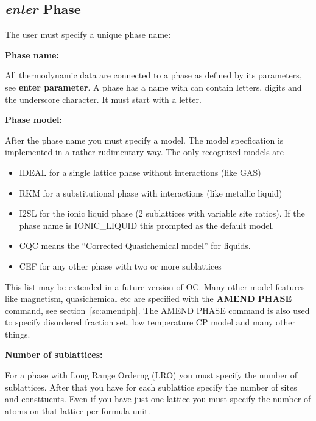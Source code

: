 \documentclass[11pt]{article}
\begin{document}
\hypertarget{Enter phase}{}
\hypertarget{enter phase name}{}
\subsection{{\em enter} Phase}

The user must specify a unique phase name:

{\bf Phase name:}

All thermodynamic data are connected to a phase as defined by its
parameters, see {\bf enter parameter}.  A phase has a name with can
contain letters, digits and the underscore character.  It must start
with a letter.

\hypertarget{Enter phase model}{{\bf Phase model:}}

After the phase name you must specify a model.  The model specfication
is implemented in a rather rudimentary way. The only recognized models
are

\begin{itemize}
\item IDEAL for a single lattice phase without interactions (like GAS)
\item RKM for a substitutional phase with interactions (like metallic
  liquid)
\item I2SL for the ionic liquid phase (2 sublattices with variable
  site ratios).  If the phase name is IONIC\_LIQUID this prompted as
  the default model.
\item CQC means the ``Corrected Quasichemical model'' for liquids.
\item CEF for any other phase with two or more sublattices
\end{itemize}

This list may be extended in a future version of OC.  Many other model
features like magnetism, quasichemical etc are specified with the {\bf
  AMEND PHASE} command, see section~\ref{sc:amendph}.  The AMEND PHASE
command is also used to specify disordered fraction set, low
temperature CP model and many other things.

\hypertarget{Enter phase subl}{{\bf Number of sublattices:}}

For a phase with Long Range Orderng (LRO) you must specify the number
of sublattices.  After that you have for each sublattice specify the
number of sites and consttuents.  Even if you have just one lattice
you must specify the number of atoms on that lattice per formula unit.
\end{document}
